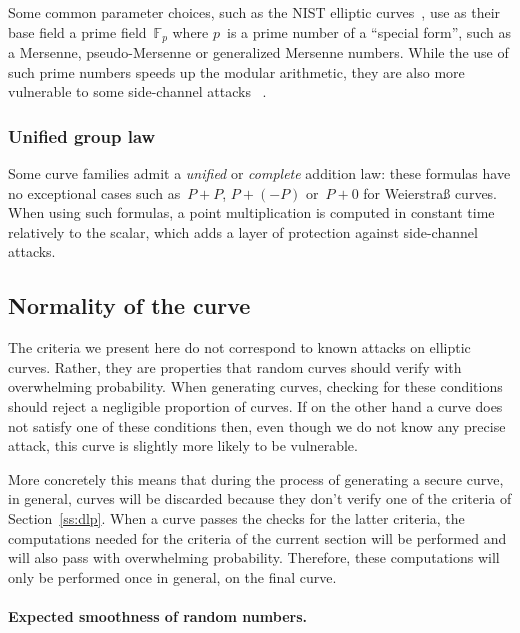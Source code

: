 \documentclass[twocolumn,letterpaper,10pt]{article}
\def\F{\mathbb{F}}
\begin{document}
Some common parameter choices,
such as the NIST elliptic curves~\cite{nist2000fips186-2},
use as their base field a prime field~$\F_p$
where $p$~is a prime number of a ``special form'',
such as a Mersenne, pseudo-Mersenne or generalized Mersenne numbers.
While the use of such prime numbers speeds up the modular arithmetic,
they are also more vulnerable to some side-channel attacks%
~\cite{ches2005dkj,ics2005ss,ches2014bpsy,eprint2014-434}.

\subsubsection{Unified group law}
\label{sss:unified}

Some curve families admit a \emph{unified} or \emph{complete}
addition law: these formulas have no exceptional cases
such as~$P + P$, $P + (-P)$ or~$P + 0$ for Weierstraß curves.
When using such formulas, a point multiplication
is computed in constant time relatively to the scalar,
which adds a layer of protection against side-channel attacks.

\subsection{Normality of the curve}
\label{ss:normal}

The criteria we present here do not correspond to
known attacks on elliptic curves.
Rather, they are properties that random curves should verify
with overwhelming probability.
When generating curves, checking for these conditions
should reject a negligible proportion of curves.
If on the other hand a curve does not satisfy one of these conditions
then, even though we do not know any precise attack,
this curve is slightly more likely to be vulnerable.

More concretely this means that during the process of generating
a secure curve, in general, curves will be discarded
because they don't verify one of the criteria of Section~\ref{ss:dlp}.
When a curve passes the checks for the latter criteria,
the computations needed for the criteria of the current section
will be performed and will also pass with overwhelming probability.
Therefore, these computations will only be performed once in general,
on the final curve.
\paragraph{Expected smoothness of random numbers.}%
\end{document}
